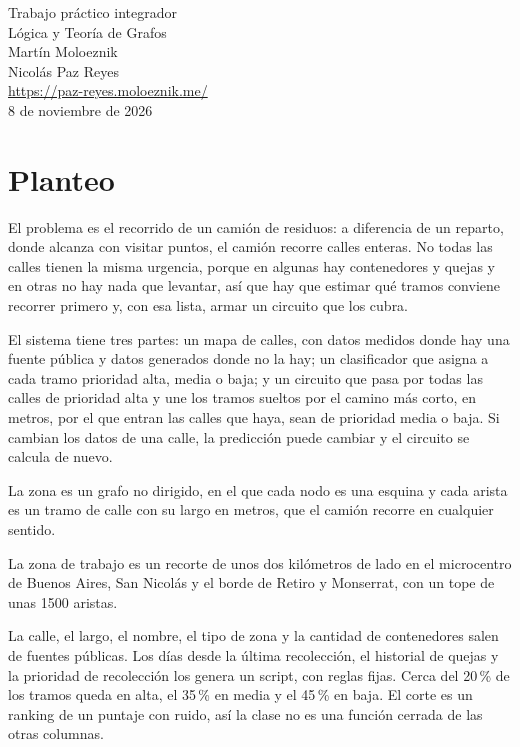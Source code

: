 \documentclass[12pt,a4paper]{report}
\begin{document}
\begin{titlepage}
\thispagestyle{empty}
\vspace*{4.5cm}
\begin{center}
{\Large Trabajo práctico integrador}\\[1.4cm]
{\Large Lógica y Teoría de Grafos}\\[2.6cm]
Martín Moloeznik\\[0.35cm]
Nicolás Paz Reyes\\[0.75cm]
\url{https://paz-reyes.moloeznik.me/}\\[1.45cm]
8 de noviembre de 2026
\end{center}
\end{titlepage}

\tableofcontents

\chapter{Planteo}

El problema es el recorrido de un camión de residuos: a diferencia de un reparto, donde alcanza con visitar puntos, el camión recorre calles enteras. No todas las calles tienen la misma urgencia, porque en algunas hay contenedores y quejas y en otras no hay nada que levantar, así que hay que estimar qué tramos conviene recorrer primero y, con esa lista, armar un circuito que los cubra.

El sistema tiene tres partes: un mapa de calles, con datos medidos donde hay una fuente pública y datos generados donde no la hay; un clasificador que asigna a cada tramo prioridad alta, media o baja; y un circuito que pasa por todas las calles de prioridad alta y une los tramos sueltos por el camino más corto, en metros, por el que entran las calles que haya, sean de prioridad media o baja. Si cambian los datos de una calle, la predicción puede cambiar y el circuito se calcula de nuevo.

La zona es un grafo no dirigido, en el que cada nodo es una esquina y cada arista es un tramo de calle con su largo en metros, que el camión recorre en cualquier sentido.

La zona de trabajo es un recorte de unos dos kilómetros de lado en el microcentro de Buenos Aires, San Nicolás y el borde de Retiro y Monserrat, con un tope de unas 1500 aristas.

La calle, el largo, el nombre, el tipo de zona y la cantidad de contenedores salen de fuentes públicas. Los días desde la última recolección, el historial de quejas y la prioridad de recolección los genera un script, con reglas fijas. Cerca del 20\,\% de los tramos queda en alta, el 35\,\% en media y el 45\,\% en baja. El corte es un ranking de un puntaje con ruido, así la clase no es una función cerrada de las otras columnas.
\end{document}
